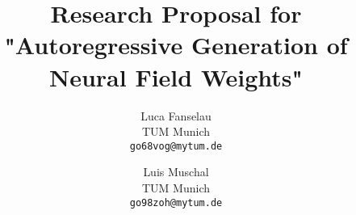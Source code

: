 \documentclass[10pt,twocolumn,letterpaper]{article}
\title{Research Proposal for "Autoregressive Generation of Neural Field Weights"}
\author{Luca Fanselau\\
TUM Munich\\
{\tt\small go68vog@mytum.de}
\and
Luis Muschal\\
TUM Munich\\
{\tt\small go98zoh@mytum.de}
}
\begin{document}
\maketitle








{
    \small
    
    
}

% 
\end{document}
